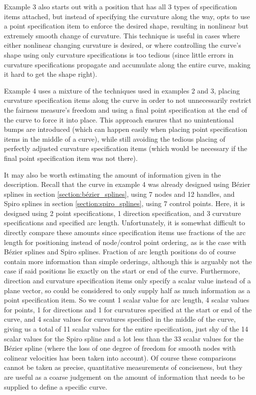 \documentclass[a4paper]{article}
\begin{document}
			Example 3 also starts out with a position that has all 3 types of specification items attached, but instead of specifying the curvature along the way, opts to use a point specification item to enforce the desired shape, resulting in nonlinear but extremely smooth change of curvature. This technique is useful in cases where either nonlinear changing curvature is desired, or where controlling the curve's shape using only curvature specifications is too tedious (since little errors in curvature specifications propagate and accumulate along the entire curve, making it hard to get the shape right).

			Example 4 uses a mixture of the techniques used in examples 2 and 3, placing curvature specification items along the curve in order to not unnecessarily restrict the fairness measure's freedom and using a final point specification at the end of the curve to force it into place. This approach ensures that no unintentional bumps are introduced (which can happen easily when placing point specification items in the middle of a curve), while still avoiding the tedious placing of perfectly adjusted curvature specification items (which would be necessary if the final point specification item was not there).

			It may also be worth estimating the amount of information given in the description. Recall that the curve in example 4 was already designed using Bézier splines in section \ref{section:bézier_splines}, using 7 nodes and 12 handles, and Spiro splines in section \ref{section:spiro_splines}, using 7 control points. Here, it is designed using 2 point specifications, 1 direction specification, and 3 curvature specifications and specified arc length. Unfortunately, it is somewhat difficult to directly compare these amounts since specification items use fractions of the arc length for positioning instead of node/control point ordering, as is the case with Bézier splines and Spiro splines. Fraction of arc length positions do of course contain more information than simple orderings, although this is arguably not the case if said positions lie exactly on the start or end of the curve. Furthermore, direction and curvature specification items only specify a scalar value instead of a plane vector, so could be considered to only supply half as much information as a point specification item. So we count 1 scalar value for arc length, 4 scalar values for points, 1 for directions and 1 for curvatures specified at the start or end of the curve, and 4 scalar values for curvatures specified in the middle of the curve, giving us a total of 11 scalar values for the entire specification, just shy of the 14 scalar values for the Spiro spline and a lot less than the 33 scalar values for the Bézier spline (where the loss of one degree of freedom for smooth nodes with colinear velocities has been taken into account). Of course these comparisons cannot be taken as precise, quantitative measurements of conciseness, but they are useful as a coarse judgement on the amount of information that needs to be supplied to define a specific curve.
\end{document}

